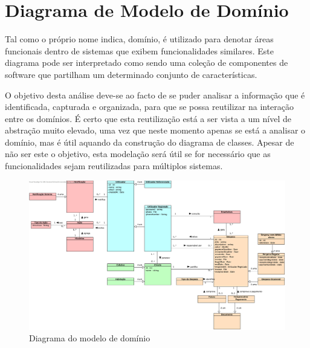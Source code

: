 \section{Diagrama de Modelo de Domínio}

Tal como o próprio nome indica, domínio, é utilizado para denotar áreas funcionais dentro de sistemas que exibem funcionalidades similares. Este diagrama pode ser interpretado como sendo uma coleção de componentes de software que partilham um determinado conjunto de características.

O objetivo desta análise deve-se ao facto de se puder analisar a informação que é identificada, capturada e organizada, para que se possa reutilizar na interação entre os domínios. É certo que esta reutilização está a ser vista a um nível de abstração muito elevado, uma vez que neste momento apenas se está a analisar o domínio, mas é útil aquando da construção do diagrama de classes. Apesar de não ser este o objetivo, esta modelação será útil se for necessário que as funcionalidades sejam reutilizadas para múltiplos sistemas. \\

\begin{figure}[H]
\centerline{\includegraphics[width=1\textwidth]{images/modeling/modeloDominio}}
\caption{Diagrama do modelo de domínio}
\label{fig:domainModel}
\end{figure}

